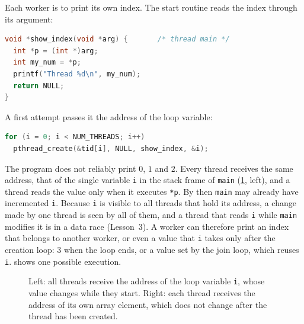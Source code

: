 \documentclass[../main.tex]{subfiles}
\begin{document}
Each worker is to print its own index.  The start routine reads
the index through its argument:
\begin{lstlisting}[language=C, numbers=none]
void *show_index(void *arg) {       /* thread main */
  int *p = (int *)arg;
  int my_num = *p;
  printf("Thread %d\n", my_num);
  return NULL;
}
\end{lstlisting}
A first attempt passes it the address of the loop variable:
\begin{lstlisting}[language=C, numbers=none]
for (i = 0; i < NUM_THREADS; i++)
  pthread_create(&tid[i], NULL, show_index, &i);
\end{lstlisting}
The program does not reliably print $0$, $1$ and $2$.  Every thread receives
the same address, that of the single variable \texttt{i} in the stack frame
of \texttt{main} (\cref{fig:l04-args}, left), and a thread reads the value
only when it executes \texttt{*p}.  By then \texttt{main} may already have
incremented \texttt{i}.  Because \texttt{i} is visible to all threads that
hold its address, a change made by one thread is seen by all of them, and a
thread that reads \texttt{i} while \texttt{main} modifies it is in a data
race (Lesson~3).  A worker can therefore print an
index that belongs to another worker, or even a value that \texttt{i} takes
only after the creation loop: $3$ when the loop ends, or a value set by the
join loop, which reuses \texttt{i}.   shows one
possible execution.

\begin{figure}[htbp]
  \centering
  
  \caption{Left: all threads receive the address of the loop variable
    \texttt{i}, whose value changes while they start.  Right: each thread
    receives the address of its own array element, which does not change
    after the thread has been created.}
  \label{fig:l04-args}
\end{figure}
\end{document}
